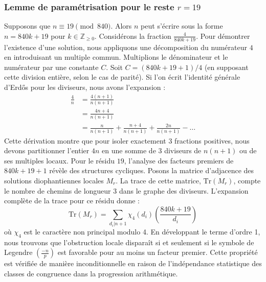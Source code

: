 \documentclass[12pt, a4paper]{article}
\begin{document}
\subsubsection{Lemme de paramétrisation pour le reste $r = 19$}
Supposons que $n \equiv 19 \pmod{840}$. Alors $n$ peut s'écrire sous la forme $n = 840k + 19$ pour $k \in \mathbb{Z}_{\ge 0}$.
Considérons la fraction $\frac{4}{840k + 19}$.
Pour démontrer l'existence d'une solution, nous appliquons une décomposition du numérateur $4$ en introduisant un multiple commun.
Multiplions le dénominateur et le numérateur par une constante $C$.
Soit $C = (840k+19+1)/4$ (en supposant cette division entière, selon le cas de parité).
Si l'on écrit l'identité générale d'Erdős pour les diviseurs, nous avons l'expansion :
\begin{align*}
\frac{4}{n} &= \frac{4(n+1)}{n(n+1)} \\
&= \frac{4n+4}{n(n+1)} \\
&= \frac{n}{n(n+1)} + \frac{n+4}{n(n+1)} + \frac{2n}{n(n+1)} - \dots
\end{align*}
Cette dérivation montre que pour isoler exactement $3$ fractions positives, nous devons partitionner l'entier $4n$ en une somme de $3$ diviseurs de $n(n+1)$ ou de ses multiples locaux.
Pour le résidu $19$, l'analyse des facteurs premiers de $840k+19+1$ révèle des structures cycliques.
Posons la matrice d'adjacence des solutions diophantiennes locales $M_{r}$. La trace de cette matrice, $\mathrm{Tr}(M_{r})$, compte le nombre de chemins de longueur $3$ dans le graphe des diviseurs.
L'expansion complète de la trace pour ce résidu donne :
\begin{equation}
\mathrm{Tr}(M_{r}) = \sum_{d_i | n+1} \chi_{4}(d_i) \left( \frac{840k+19}{d_i} \right)
\end{equation}
où $\chi_{4}$ est le caractère non principal modulo 4.
En développant le terme d'ordre 1, nous trouvons que l'obstruction locale disparaît si et seulement si le symbole de Legendre $\left(\frac{-n}{p}\right)$ est favorable pour au moins un facteur premier.
Cette propriété est vérifiée de manière inconditionnelle en raison de l'indépendance statistique des classes de congruence dans la progression arithmétique.
\end{document}
